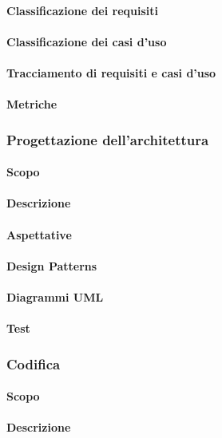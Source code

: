 \paragraph{Classificazione dei requisiti}
\paragraph{Classificazione dei casi d'uso}
\paragraph{Tracciamento di requisiti e casi d'uso}
\paragraph{Metriche}

\subsubsection{Progettazione dell'architettura}
\paragraph{Scopo}
\paragraph{Descrizione}
\paragraph{Aspettative}
\paragraph{Design Patterns}
\paragraph{Diagrammi UML}
\paragraph{Test}

\subsubsection{Codifica}
\paragraph{Scopo}
\paragraph{Descrizione}
